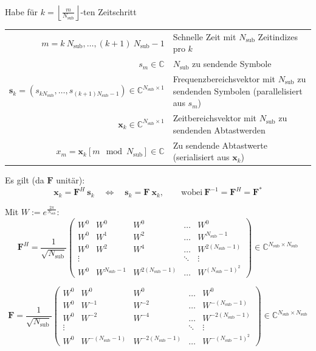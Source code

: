 \documentclass[a4paper, 11pt]{article}
\begin{document}
Habe für $k = \left \lfloor \frac{m}{N_{\mathrm{sub}}} \right \rfloor$-ten Zeitschritt
\begin{center}
\begin{tabular}{r p{9cm}}
	$m = k ~ N_{\mathrm{sub}}, \ldots, (k + 1) ~ N_{\mathrm{sub}} - 1$ & Schnelle Zeit mit $N_{\mathrm{sub}}$ Zeitindizes pro $k$ \\
	$s_m \in \mathbb C$ & $N_\mathrm{sub}$ zu sendende Symbole \\
	$\mathbf s_k = (s_{k N_\mathrm{sub}}, \ldots, s_{(k + 1) N_\mathrm{sub} - 1}) \in \mathbb C^{N_\mathrm{sub} \times 1}$ & Frequenzbereichsvektor mit $N_{\mathrm{sub}}$ zu sendenden Symbolen (parallelisiert aus $s_m$) \\
	$\mathbf x_k \in \mathbb C^{N_\mathrm{sub} \times 1}$ & Zeitbereichsvektor mit $N_{\mathrm{sub}}$ zu sendenden Abtastwerden \\
	$x_m = \mathbf x_k[m \mod N_{\mathrm{sub}}] \in \mathbb C$ & Zu sendende Abtastwerte (serialisiert aus $\mathbf x_k$) \\
\end{tabular}
\end{center}

Es gilt (da $\mathbf F$ unitär):
\[
	\mathbf x_k = \mathbf F^H ~ \mathbf s_k \quad \Leftrightarrow \quad \mathbf s_k = \mathbf F ~ \mathbf x_k, \qquad \text{wobei} ~ \mathbf F^{-1} = \mathbf F^H = \mathbf F^*
\]

Mit $W := e^{\frac{2 \pi}{N_{\mathrm{sub}}}}$:
\[
	\mathbf F^H = \frac{1}{\sqrt{N_\mathrm{sub}}} \begin{pmatrix}
		W^0 & W^0 & W^0 & \ldots & W^0 \\
		W^0 & W^1 & W^2 & \ldots & W^{N_\mathrm{sub} - 1} \\
		W^0 & W^2 & W^4 & \ldots & W^{2 (N_\mathrm{sub} - 1)} \\
		\vdots & & & \ddots & \vdots \\
		W^0 & W^{N_\mathrm{sub} - 1} & W^{2(N_\mathrm{sub} - 1)} & \ldots & W^{(N_\mathrm{sub} - 1)^2}
	\end{pmatrix} \in \mathbb C^{N_\mathrm{sub} \times N_\mathrm{sub}}
\]

\[
	\mathbf F = \frac{1}{\sqrt{N_\mathrm{sub}}} \begin{pmatrix}
		W^0 & W^0 & W^0 & \ldots & W^0 \\
		W^0 & W^{-1} & W^{-2} & \ldots & W^{-(N_\mathrm{sub} - 1)} \\
		W^0 & W^{-2} & W^{-4} & \ldots & W^{-2 (N_\mathrm{sub} - 1)} \\
		\vdots & & & \ddots & \vdots \\
		W^0 & W^{-(N_\mathrm{sub} - 1)} & W^{-2(N_\mathrm{sub} - 1)} & \ldots & W^{-(N_\mathrm{sub} - 1)^2}
	\end{pmatrix} \in \mathbb C^{N_\mathrm{sub} \times N_\mathrm{sub}}
\]
\end{document}
